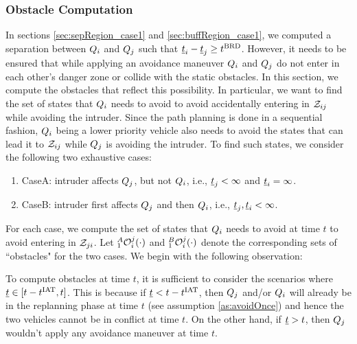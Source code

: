\subsubsection{Obstacle Computation} \label{sec:intruderObs_case1}
In sections \ref{sec:sepRegion_case1} and \ref{sec:buffRegion_case1}, we computed a separation between $Q_i$ and $Q_j$ such that $\underline{t}_i - \underline{t}_j \geq t^\text{BRD}$. However, it needs to be ensured that while applying an avoidance maneuver $Q_i$ and $Q_j$ do not enter in each other's danger zone or collide with the static obstacles. In this section, we compute the obstacles that reflect this possibility. In particular, we want to find the set of states that $Q_i$ needs to avoid to avoid accidentally entering in $\mathcal{Z}_{ij}$ while avoiding the intruder. Since the path planning is done in a sequential fashion, $Q_i$ being a lower priority vehicle also needs to avoid the states that can lead it to $\mathcal{Z}_{ij}$ while $Q_j$ is avoiding the intruder. To find such states, we consider the following two exhaustive cases:
\begin{enumerate}
\item CaseA: intruder affects $Q_j$, but not $Q_i$, i.e., $\underline{t}_j < \infty$ and $\underline{t}_i = \infty$.
\item CaseB: intruder first affects $Q_j$ and then $Q_i$, i.e., $\underline{t}_j, \underline{t}_i < \infty$.
\end{enumerate}
For each case, we compute the set of states that $Q_i$ needs to avoid at time $t$ to avoid entering in $\mathcal{Z}_{ji}$. Let $_1^A\mathcal{O}_i^j(\cdot)$ and $_1^B\mathcal{O}_i^j(\cdot)$ denote the corresponding sets of ``obstacles" for the two cases. We begin with the following observation: 
\begin{observation} \label{obs1_case1Obs}
To compute obstacles at time $t$, it is sufficient to consider the scenarios where $\underline{t} \in [t-t^\text{IAT}, t]$. This is because if $\underline{t} < t - t^\text{IAT}$, then $Q_j$ and/or $Q_i$ will already be in the replanning phase at time $t$ (see assumption \ref{as:avoidOnce}) and hence the two vehicles cannot be in conflict at time $t$. On the other hand, if $\underline{t} > t$, then $Q_j$ wouldn't apply any avoidance maneuver at time $t$. 
\end{observation}


